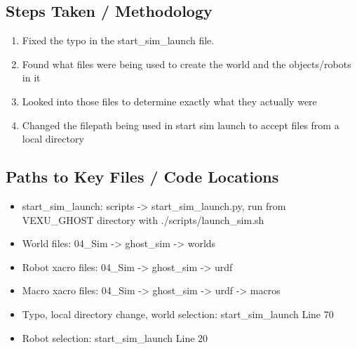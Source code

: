 \subsection*{Steps Taken / Methodology}
\begin{enumerate}
    \item Fixed the typo in the start\_sim\_launch file.
    \item Found what files were being used to create the world and the objects/robots in it
    \item Looked into those files to determine exactly what they actually were
    \item Changed the filepath being used in start sim launch to accept files from a local directory
\end{enumerate}

\subsection*{Paths to Key Files / Code Locations}
\begin{itemize}
    \item start\_sim\_launch: scripts -> start\_sim\_launch.py, run from VEXU\_GHOST directory with ./scripts/launch\_sim.sh
    \item World files: 04\_Sim -> ghost\_sim -> worlds
    \item Robot xacro files: 04\_Sim -> ghost\_sim -> urdf
    \item Macro xacro files: 04\_Sim -> ghost\_sim -> urdf -> macros
    \item Typo, local directory change, world selection: start\_sim\_launch Line 70
    \item Robot selection: start\_sim\_launch Line 20
\end{itemize}

